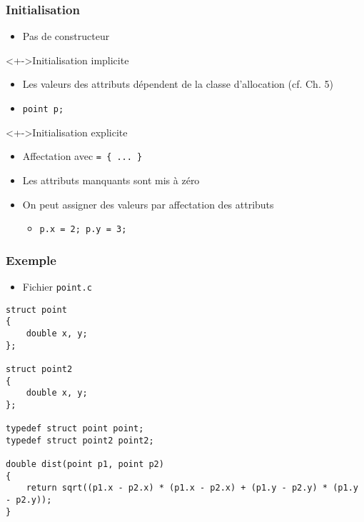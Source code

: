 \begin{frame}
\frametitle{Initialisation}
\begin{itemize}[<+->]
\item Pas de constructeur
\end{itemize}
\begin{exampleblock}<+->{Initialisation implicite}
	\begin{itemize}[<+->]
	\item Les valeurs des attributs dépendent de la classe d'allocation (cf. Ch. 5)
	\item \lstinline|point p;|
	\end{itemize}
\end{exampleblock}
\begin{exampleblock}<+->{Initialisation explicite}
	\begin{itemize}[<+->]
	\item Affectation avec \texttt{= \{ ... \}}
	\item Les attributs manquants sont mis à zéro
	\end{itemize}
\end{exampleblock}
\begin{itemize}[<+->]
\item On peut assigner des valeurs par affectation des attributs
	\begin{itemize}
	\item \lstinline|p.x = 2; p.y = 3;|
	\end{itemize}
\end{itemize}
\end{frame}

\begin{frame}[containsverbatim]
\frametitle{Exemple}
\begin{itemize}
\item Fichier \texttt{point.c}
\end{itemize}
\begin{lstlisting}
struct point
{
	double x, y;	
};

struct point2
{
	double x, y;	
};

typedef struct point point;
typedef struct point2 point2;

double dist(point p1, point p2)
{	
	return sqrt((p1.x - p2.x) * (p1.x - p2.x) + (p1.y - p2.y) * (p1.y - p2.y)); 
}
\end{lstlisting}
\end{frame}

